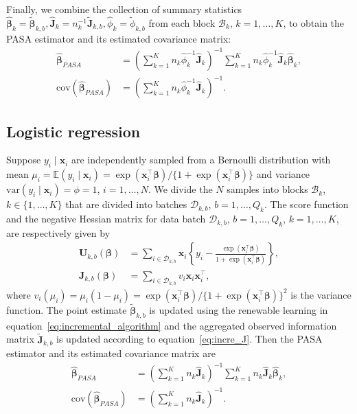\documentclass[12pt]{article}
\newcommand{\bJ}{\boldsymbol{J}}
\newcommand{\bU}{\boldsymbol{U}}
\newcommand{\bx}{\boldsymbol{x}}
\newcommand{\bbeta}{\boldsymbol{\beta}}
\begin{document}
Finally, we combine the collection of summary statistics $\widehat{\bbeta}_k=\widetilde{\bbeta}_{k,b},\widehat{\bJ}_k=n_k^{-1}\widetilde{\bJ}_{k,b},\widehat{\phi}_k=\widetilde{\phi}_{k,b}$ from each block $\mathcal{B}_k$, $k=1,\dots,K$, to obtain the PASA estimator and its estimated covariance matrix:
\begin{align*}
\widehat{\bbeta}_{PASA}&=\left( \sum \limits_{k=1}^K
n_k \widehat{\phi}^{-1}_k \widehat{\bJ}_k
\right)^{-1} 
\sum \limits_{k=1}^K  n_k\widehat{\phi}^{-1}_k \widehat{\bJ}_k \widehat{\bbeta}_k, \\
\text{cov}(\widehat{\bbeta}_{PASA}) &= \left(\sum_{k=1}^K n_k\widehat{\phi}_k^{-1}\widehat{\bJ}_{k} \right)^{-1}.
\end{align*}

\subsection{Logistic regression}
\label{subsec:examples:logistic}
Suppose $y_i\mid\bx_i$ are independently sampled from a Bernoulli distribution with mean $\mu_i=\mathbb{E}(y_i\mid\bx_i)= \exp(\bx_i^\top \bbeta)/\{1+\exp (\bx_i^\top \bbeta)\}$ and variance $\text{var}(y_i \mid\bx_i)=\phi=1$, $i=1, \ldots, N$. We divide the $N$ samples into blocks $\mathcal{B}_k$, $k \in \{1, \ldots, K\}$ that are divided into batches $\mathcal{D}_{k, b}$, $b=1, \ldots, Q_k$. The score function and the negative Hessian matrix for data batch $\mathcal{D}_{k,b}$, $b=1, \ldots, Q_k$, $k=1, \ldots, K$, are respectively given by
\begin{align*}
\bU_{k,b}(\bbeta) &= \sum_{i\in\mathcal{D}_{k,b}}\bx_{i}\left\{y_{i}-\frac{\exp(\bx_{i}^\top\bbeta)}{1+\exp(\bx_{i}^\top\bbeta)} \right\}, \\
\bJ_{k,b}(\bbeta) &= \sum_{i\in\mathcal{D}_{k,b}} v_{i}\bx_{i}\bx_{i}^\top,
\end{align*}
where $v_{i}(\mu_{i})=\mu_{i}(1-\mu_{i})=\exp(\bx_{i}^\top\bbeta)/\{1+\exp(\bx_{i}^\top\bbeta) \}^2$ is the variance function. The point estimate $\widetilde{\bbeta}_{k,b}$ is updated using the renewable learning in equation~\eqref{eq:incremental_algorithm} and the aggregated observed information matrix $\widetilde{\bJ}_{k,b}$ is updated according to equation~\eqref{eq:incre_J}. Then the PASA estimator and its estimated covariance matrix are
\begin{align*}
\widehat{\bbeta}_{PASA} &=\left( \sum \limits_{k=1}^K n_k\widehat{\bJ}_k
\right)^{-1} 
\sum \limits_{k=1}^K n_k\widehat{\bJ}_k \widehat{\bbeta}_k, \\
\text{cov}(\widehat{\bbeta}_{PASA}) &= \left(\sum_{k=1}^K n_k\widehat{\bJ}_k \right)^{-1}.
\end{align*}
\end{document}
